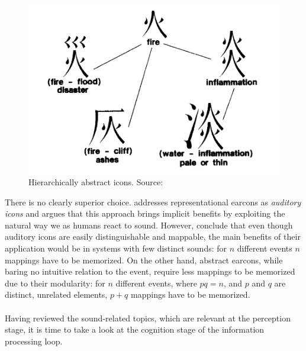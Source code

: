 \begin{figure}
	\centering
	\includegraphics[width=0.5\linewidth]{figures/placeholders/icons_tree_structure}
	\caption{Hierarchically abstract icons. Source: \parencite{blattner_1989_earcons}}
	\label{fig:iconstreestructure}
\end{figure}

There is no clearly superior choice. \parencite{gaver_sonicfinder:_1989} addresses representational earcons as \textit{auditory icons} and argues that this approach brings implicit benefits by exploiting the natural way we as humans react to sound. 
However, \parencite{blattner_earcons_1989} conclude that even though auditory icons are easily distinguishable and mappable, the main benefits of their application would be in systems with few distinct sounds: for $n$ different events $n$ mappings have to be memorized.
On the other hand, abstract earcons, while baring no intuitive relation to the event, require less mappings to be memorized due to their modularity: for $n$ different events, where $pq=n$, and $p$ and $q$ are distinct, unrelated elements, $p+q$ mappings have to be memorized.

\paragraph[Bridge]{}
Having reviewed the sound-related topics, which are relevant at the perception stage, it is time to take a look at the cognition stage of the information processing loop.


